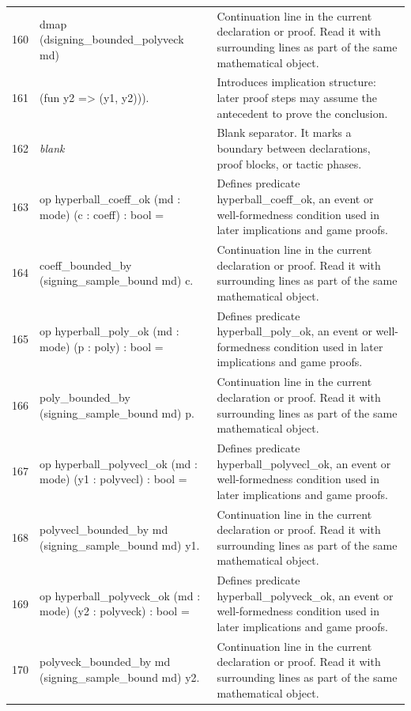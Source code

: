 \documentclass[10pt]{article}
\begin{document}
\begin{longtable}{r L{0.53\textwidth} L{0.37\textwidth}}
160 & {\ttfamily\scriptsize       dmap (dsigning\_bounded\_polyveck md)} & Continuation line in the current declaration or proof.  Read it with surrounding lines as part of the same mathematical object. \\
161 & {\ttfamily\scriptsize         (fun y2 => (y1, y2))).} & Introduces implication structure: later proof steps may assume the antecedent to prove the conclusion. \\
162 & {\ttfamily\scriptsize \emph{blank}} & Blank separator.  It marks a boundary between declarations, proof blocks, or tactic phases. \\
163 & {\ttfamily\scriptsize op hyperball\_coeff\_ok (md : mode) (c : coeff) : bool =} & Defines predicate hyperball\_coeff\_ok, an event or well-formedness condition used in later implications and game proofs. \\
164 & {\ttfamily\scriptsize   coeff\_bounded\_by (signing\_sample\_bound md) c.} & Continuation line in the current declaration or proof.  Read it with surrounding lines as part of the same mathematical object. \\
165 & {\ttfamily\scriptsize op hyperball\_poly\_ok (md : mode) (p : poly) : bool =} & Defines predicate hyperball\_poly\_ok, an event or well-formedness condition used in later implications and game proofs. \\
166 & {\ttfamily\scriptsize   poly\_bounded\_by (signing\_sample\_bound md) p.} & Continuation line in the current declaration or proof.  Read it with surrounding lines as part of the same mathematical object. \\
167 & {\ttfamily\scriptsize op hyperball\_polyvecl\_ok (md : mode) (y1 : polyvecl) : bool =} & Defines predicate hyperball\_polyvecl\_ok, an event or well-formedness condition used in later implications and game proofs. \\
168 & {\ttfamily\scriptsize   polyvecl\_bounded\_by md (signing\_sample\_bound md) y1.} & Continuation line in the current declaration or proof.  Read it with surrounding lines as part of the same mathematical object. \\
169 & {\ttfamily\scriptsize op hyperball\_polyveck\_ok (md : mode) (y2 : polyveck) : bool =} & Defines predicate hyperball\_polyveck\_ok, an event or well-formedness condition used in later implications and game proofs. \\
170 & {\ttfamily\scriptsize   polyveck\_bounded\_by md (signing\_sample\_bound md) y2.} & Continuation line in the current declaration or proof.  Read it with surrounding lines as part of the same mathematical object. \\

\end{longtable}
\end{document}
